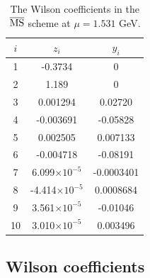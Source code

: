 \documentclass[aps,prl,
superscriptaddress,
showpacs,
preprintnumbers,
bibnotes,
amsmath,
amssymb,
twocolumn,
floatfix,
]{revtex4-1}
\begin{document}
\begin{table}[t]
\begin{tabular}{ccc}
\hline\hline
$i$ & $z_i$ & $y_i$ \\
\hline
1 & -0.3734				&  0 			\\
2 & 1.189					&  0			\\
3 & 0.001294				&  0.02720	\\
4 & -0.003691				& -0.05828 	\\ 
5 & 0.002505				&  0.007133	\\ 
6 & -0.004718 				& -0.08191	\\ 
7 & 6.099$\times 10^{-5}$	& -0.0003401	\\
8 & -4.414$\times 10^{-5}$	&  0.0008684	\\ 
9 & 3.561$\times 10^{-5}$	& -0.01046	\\
10 & 3.010$\times 10^{-5}$	&  0.003496
\end{tabular}
\caption{The Wilson coefficients in the $\overline{\rm MS}$ scheme at $\mu=1.531$ GeV. \label{tab:wilsoncoeffs} }
\end{table}

\subsection{Wilson coefficients}
\end{document}

